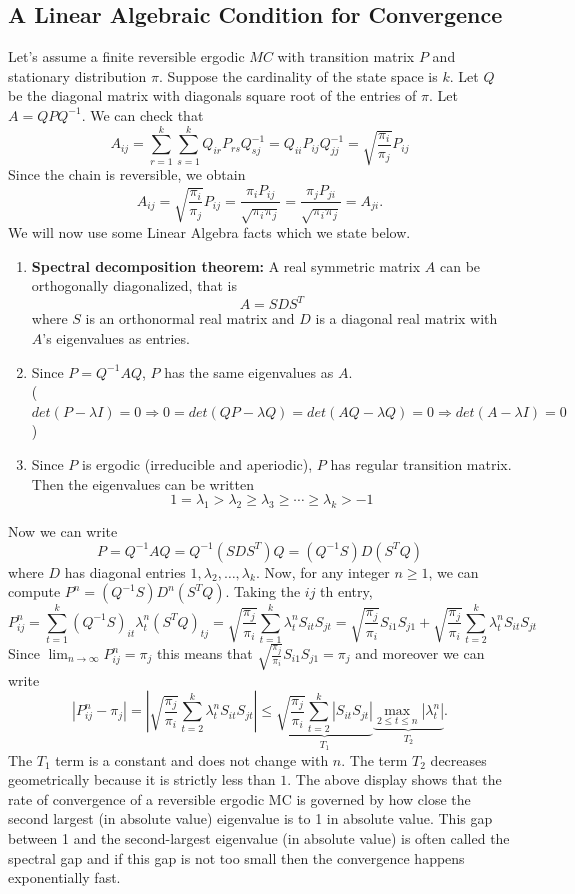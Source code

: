 \documentclass[11pt,a4paper]{article}
\begin{document}
\subsection{A Linear Algebraic Condition for Convergence}
Let's assume a finite reversible ergodic $M C$ with transition matrix $P$ and stationary distribution $\pi$. Suppose the cardinality of the state space is $k$. Let $Q$ be the diagonal matrix with diagonals square root of the entries of $\pi$. Let $A=Q P Q^{-1}$.
We can check that
$$
A_{i j}=\sum_{r=1}^k \sum_{s=1}^k Q_{i r} P_{r s} Q_{s j}^{-1}=Q_{i i} P_{i j} Q_{j j}^{-1}=\sqrt{\frac{\pi_i}{\pi_j}} P_{i j}
$$
Since the chain is reversible, we obtain
$$
A_{i j}=\sqrt{\frac{\pi_i}{\pi_j}} P_{i j}=\frac{\pi_i P_{i j}}{\sqrt{\pi_i \pi_j}}=\frac{\pi_j P_{j i}}{\sqrt{\pi_i \pi_j}}=A_{j i} .
$$
We will now use some Linear Algebra facts which we state below.
\begin{enumerate}[(1)]
    \item \textbf{Spectral decomposition theorem:} A real symmetric matrix $A$ can be orthogonally diagonalized, that is $$A=S D S^T$$ where $S$ is an orthonormal real matrix and $D$ is a diagonal real matrix with $A$'s eigenvalues as entries.
    \item Since $P=Q^{-1}AQ$, $P$ has the same eigenvalues as $A$.\\($det(P-\lambda I)=0 \Rightarrow 0=det(QP-\lambda Q)=det(AQ-\lambda Q)=0 \Rightarrow det(A-\lambda I)=0$)
    \item Since $P$ is ergodic (irreducible and aperiodic), $P$ has regular transition matrix. Then the eigenvalues can be written $$1=\lambda_1>\lambda_2\geq \lambda_3\geq \cdots\geq \lambda_k>-1$$
\end{enumerate}
Now we can write
$$
P=Q^{-1} A Q=Q^{-1}\left(S D S^T\right) Q=\left(Q^{-1} S\right) D\left(S^T Q\right)
$$
where $D$ has diagonal entries $1, \lambda_2, \ldots, \lambda_k$. Now, for any integer $n \geq 1$, we can compute $P^n=\left(Q^{-1} S\right) D^n\left(S^T Q\right)$. Taking the $i j$ th entry,
$$
P_{i j}^n=\sum_{t=1}^k\left(Q^{-1} S\right)_{i t} \lambda_t^n\left(S^T Q\right)_{t j}=\sqrt{\frac{\pi_j}{\pi_i}} \sum_{t=1}^k \lambda_t^n S_{i t} S_{j t}=\sqrt{\frac{\pi_j}{\pi_i}} S_{i 1} S_{j 1}+\sqrt{\frac{\pi_j}{\pi_i}} \sum_{t=2}^k \lambda_t^n S_{i t} S_{j t}
$$
Since $\lim _{n \rightarrow \infty} P_{i j}^n=\pi_j$ this means that $\sqrt{\frac{\pi_j}{\pi_i}} S_{i 1} S_{j 1}=\pi_j$ and moreover we can write
$$
\left|P_{i j}^n-\pi_j\right|=\left|\sqrt{\frac{\pi_j}{\pi_i}} \sum_{t=2}^k \lambda_t^n S_{i t} S_{j t}\right| \leq \underbrace{\sqrt{\frac{\pi_j}{\pi_i}} \sum_{t=2}^k\left|S_{i t} S_{j t}\right|}_{T_1} \underbrace{\max _{2 \leq t \leq n}\left|\lambda_t^n\right|}_{T_2} .
$$
The $T_1$ term is a constant and does not change with $n$. The term $T_2$ decreases geometrically because it is strictly less than $1$. The above display shows that the rate of convergence of a reversible ergodic $\mathrm{MC}$ is governed by how close the second largest (in absolute value) eigenvalue is to 1 in absolute value. This gap between 1 and the second-largest eigenvalue (in absolute value) is often called the spectral gap and if this gap is not too small then the convergence happens exponentially fast.
\end{document}
